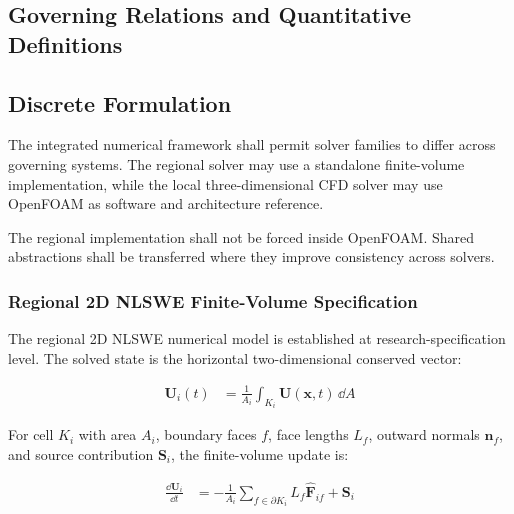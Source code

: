 \subsection{Governing Relations and Quantitative Definitions}
\label{sec:res-num-spec-governing-relations}

%

\subsection{Discrete Formulation}
\label{sec:res-num-spec-discrete-formulation}

The integrated numerical framework shall permit solver families to
differ across governing systems. The regional solver may use a
standalone finite-volume implementation, while the local
three-dimensional CFD solver may use OpenFOAM as software and
architecture reference.

The regional implementation shall not be forced inside OpenFOAM. Shared
abstractions shall be transferred where they improve consistency across
solvers.

\subsubsection{Regional 2D NLSWE Finite-Volume Specification}
\label{sec:res-num-spec-regional-2d-nlswe-specification}

The regional 2D NLSWE numerical model is established at
research-specification level. The solved state is the horizontal
two-dimensional conserved vector:

\begin{align}
  \mathbf{U}_i(t)
  &=
  \frac{1}{A_i}
  \int_{K_i}
  \mathbf{U}(\mathbf{x},t)
  \,\dd A
  \label{eq:res-num-spec-regional-cell-average}
\end{align}

For cell $K_i$ with area $A_i$, boundary faces $f$, face lengths
$L_f$, outward normals $\mathbf{n}_f$, and source contribution
$\mathbf{S}_i$, the finite-volume update is:

\begin{align}
  \frac{\dd\mathbf{U}_i}{\dd t}
  &=
  -
  \frac{1}{A_i}
  \sum_{f\in\partial K_i}
  L_f
  \widehat{\mathbf{F}}_{if}
  +
  \mathbf{S}_i
  \label{eq:res-num-spec-regional-fv-update}
\end{align}

